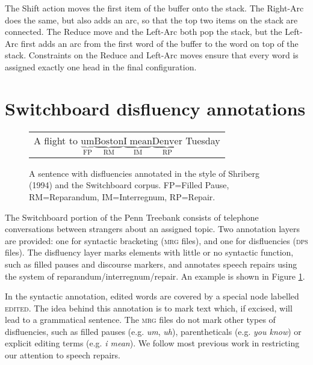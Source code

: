 \documentclass[11pt,letterpaper]{article}
\begin{document}
The Shift action moves the first item of the buffer onto the stack.
The Right-Arc does the same, but also adds an arc, so that the top two items
on the stack are connected. The Reduce move and the Left-Arc both pop the stack,
but the Left-Arc first adds an arc from the first word of the buffer to the word
on top of the stack. Constraints on the Reduce and Left-Arc
moves ensure that every word is assigned exactly one head in the final configuration.

\section{Switchboard disfluency annotations}
\label{sec:swbd}

\begin{figure}
    \begin{tabular}{l}

        A flight to $\underbrace{\mathrm{um}}_\text{FP} \underbrace{\mathrm{Boston}}_\text{RM} \underbrace{\mathrm{I\;mean}}_\text{IM} \underbrace{\mathrm{Denver}}_\text{RP}$ Tuesday\\

\end{tabular}
\caption{\small A sentence with disfluencies annotated in the style of Shriberg (1994) 
    and the Switchboard corpus.
FP=Filled Pause, RM=Reparandum, IM=Interregnum, RP=Repair.\label{fig:shriberg}}
\end{figure}

The Switchboard portion of the Penn Treebank \citep{marcus:93} consists of
telephone conversations between strangers about
an assigned topic.  Two annotation layers are provided: one for syntactic
bracketing (\textsc{mrg} files),
and one for disfluencies (\textsc{dps} files).  The disfluency layer marks
elements with little or no syntactic function, such as filled pauses and discourse
markers, and annotates speech repairs using the \citet{shriberg:94} system of
reparandum/interregnum/repair. An example is shown in Figure \ref{fig:shriberg}.

In the syntactic annotation, edited words are covered by a special node labelled
\textsc{edited}.
The idea behind this annotation is to mark text which, if
excised, will lead to a grammatical sentence.  The \textsc{mrg} files do not
mark other types of disfluencies, such as filled pauses (e.g. \emph{um}, \emph{uh}),
parentheticals (e.g. \emph{you know}) or explicit editing terms (e.g. \emph{i mean}).
We follow most previous work in restricting our attention to speech repairs.
\end{document}
